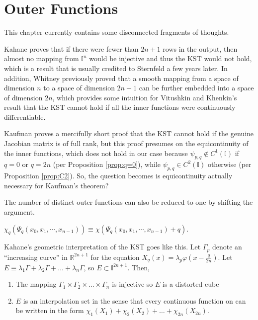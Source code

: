 \chapter{Outer Functions}\label{ch:OuterFunctions}

This chapter currently contains some disconnected fragments of thoughts.

Kahane proves that if there were fewer than $2n + 1$ rows in the output, then almost no mapping from $\mathbb{I}^n$ would be injective and thus the KST would not hold, which is a result that is usually credited to Sternfeld a few years later. In addition, Whitney previously proved that a smooth mapping from a space of dimension $n$ to a space of dimension $2n + 1$ can be further embedded into a space of dimension $2n$, which provides some intuition for Vitushkin and Khenkin's result that the KST cannot hold if all the inner functions were continuously differentiable.

Kaufman proves a mercifully short proof that the KST cannot hold if the genuine Jacobian matrix is of full rank, but this proof presumes on the equicontinuity of the inner functions, which does not hold in our case because $\psi_{p,q} \notin C^1\left(\mathbb{I}\right)$ if $q = 0$ or $q = 2n$ (per Proposition \ref{prop:q=0}), while $\psi_{p,q} \in C^2\left(\mathbb{I}\right)$ otherwise (per Proposition \ref{prop:C2}). So, the question becomes is equicontinuity actually necessary for Kaufman's theorem?

The number of distinct outer functions can also be reduced to one by shifting the argument.
\begin{definition}
  \label{def:outer}
  $\chi_q\left(\Psi_q\left(x_0, x_1, \cdots, x_{n - 1}\right)\right) \equiv \chi\left(\Psi_q\left(x_0, x_1, \cdots, x_{n - 1}\right) + q\right)$.
\end{definition}

Kahane's geometric interpretation of the KST goes like this. Let $\Gamma_p$ denote an ``increasing curve'' in $\mathbb{R}^{2n + 1}$ for the equation $X_q\left(x\right) = \lambda_p \varphi\left(x - \frac{q}{2n}\right)$. Let $E \equiv \lambda_1 \Gamma + \lambda_2 \Gamma + \dots + \lambda_n \Gamma$, so $E \subset \mathbb{I}^{2n + 1}$. Then,
\begin{enumerate}
  \item The mapping $\Gamma_1 \times \Gamma_2 \times \dots \times \Gamma_n$ is injective so $E$ is a distorted cube
  \item $E$ is an interpolation set in the sense that every continuous function on can be written in the form $\chi_1\left(X_1\right) + \chi_2\left(X_2\right) + \dots + \chi_{2n}\left(X_{2n}\right)$.
\end{enumerate}

